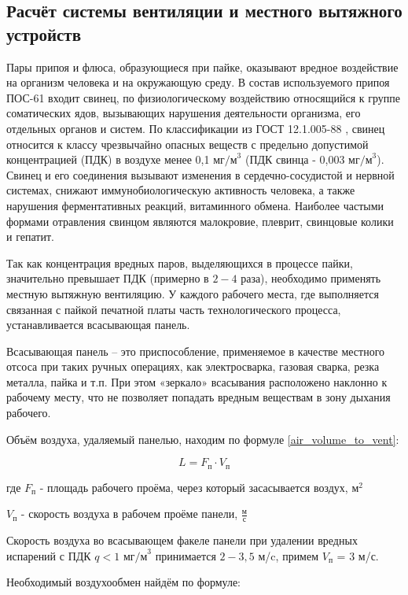 \newpage

\subsection{Расчёт системы вентиляции и местного вытяжного устройств}

Пары припоя и флюса, образующиеся при пайке, оказывают вредное воздействие на
организм человека и на окружающую среду. В состав используемого припоя ПОС-61
входит свинец, по физиологическому воздействию относящийся к группе соматических
ядов, вызывающих нарушения деятельности организма, его отдельных органов и систем.
По классификации из ГОСТ 12.1.005-88 \cite{ecology_gost_005_88}, свинец относится
к классу чрезвычайно опасных веществ с предельно допустимой концентрацией (ПДК)
в воздухе менее 0,1 $\text{мг/м}^3$ (ПДК свинца - 0,003 $\text{мг/м}^3$). Свинец
и его соединения вызывают изменения в сердечно-сосудистой и нервной системах,
снижают иммунобиологическую активность человека, а также нарушения ферментативных
реакций, витаминного обмена. Наиболее частыми формами отравления свинцом являются
малокровие, плеврит, свинцовые колики и гепатит.

Так как концентрация вредных паров, выделяющихся в процессе пайки, значительно
превышает ПДК (примерно в $2 - 4$ раза), необходимо применять местную вытяжную вентиляцию.
У каждого рабочего места, где выполняется связанная с пайкой печатной платы часть
технологического процесса, устанавливается всасывающая панель.

Всасывающая панель – это приспособление, применяемое в качестве местного отсоса
при таких ручных операциях, как электросварка, газовая сварка, резка металла,
пайка и т.п. При этом «зеркало» всасывания расположено наклонно к рабочему месту,
что не позволяет попадать вредным веществам в зону дыхания рабочего.

Объём воздуха, удаляемый панелью, находим по формуле \ref{air_volume_to_vent}:

\begin{equation}
\label{air_volume_to_vent}
    L = F_\textit{п} \cdot V_\textit{п}
\end{equation}

где $F_\textit{п}$ - площадь рабочего проёма, через который засасывается воздух, $\textit{м}^2$

$V_\textit{п}$ - скорость воздуха в рабочем проёме панели, $\frac{\text{м}}{\text{с}}$

Скорость воздуха во всасывающем факеле панели при удалении вредных испарений с
ПДК $q < 1$ $\text{мг/м}^3$ \cite[табл. 1.1]{local_vent_spot_calc_method} принимается $2 - 3,5$ м/c, примем $V_\textit{п}$ = 3 м/с.

Необходимый воздухообмен найдём по формуле:
